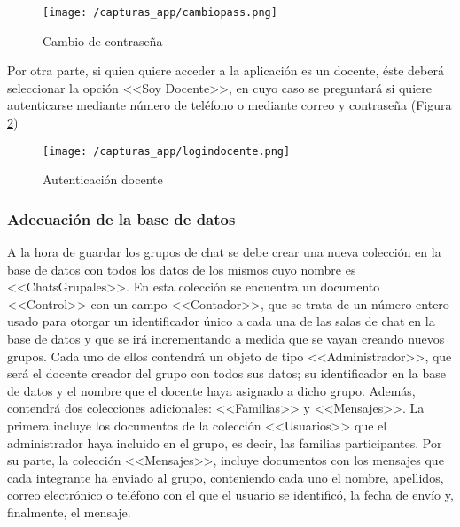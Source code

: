 \begin{figure}[!h]
	\begin{center}
		\texttt{[image: /capturas\_app/cambiopass.png]}
		\caption{Cambio de contraseña}
		\label{fig:cambiopass}
	\end{center}
\end{figure}

\clearpage

Por otra parte, si quien quiere acceder a la aplicación es un docente, éste deberá seleccionar la opción <<Soy Docente>>, en cuyo caso se preguntará si quiere autenticarse mediante número de teléfono o mediante correo y contraseña (Figura \ref{fig:logindocente})

\begin{figure}[!h]
	\begin{center}
		\texttt{[image: /capturas\_app/logindocente.png]}
		\caption{Autenticación docente}
		\label{fig:logindocente}
	\end{center}
\end{figure}

\subsubsection{Adecuación de la base de datos}
A la hora de guardar los grupos de chat se debe crear una nueva colección en la base de datos con todos los datos de los mismos cuyo nombre es <<ChatsGrupales>>. En esta colección se encuentra un documento <<Control>> con un campo <<Contador>>, que se trata de un número entero usado para otorgar un identificador único a cada una de las salas de chat en la base de datos y que se irá incrementando a medida que se vayan creando nuevos grupos. Cada uno de ellos contendrá un objeto de tipo <<Administrador>>, que será el docente creador del grupo con todos sus datos; su identificador en la base de datos y el nombre que el docente haya asignado a dicho grupo. Además, contendrá dos colecciones adicionales: <<Familias>> y <<Mensajes>>. La primera incluye los documentos de la colección <<Usuarios>> que el administrador haya incluido en el grupo, es decir, las familias participantes. Por su parte, la colección <<Mensajes>>, incluye documentos con los mensajes que cada integrante ha enviado al grupo, conteniendo cada uno el nombre, apellidos, correo electrónico o teléfono con el que el usuario se identificó, la fecha de envío y, finalmente, el mensaje.

